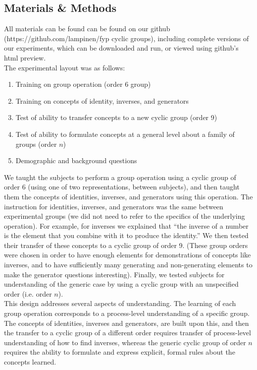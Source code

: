 \documentclass[11pt]{article}
\begin{document}
\subsection{Materials \& Methods} 
All materials can be found can be found on our github (https://github.com/lampinen/fyp cyclic groups), including complete versions of our experiments, which can be downloaded and run, or viewed using github's html preview. \\[11pt]
The experimental layout was as follows:
\begin{enumerate}
\item Training on group operation (order 6 group)
\item Training on concepts of identity, inverses, and generators
\item Test of ability to transfer concepts to a new cyclic group (order 9)
\item Test of ability to formulate concepts at a general level about a family of groups (order $n$)
\item Demographic and background questions
\end{enumerate}
We taught the subjects to perform a group operation using a cyclic group of order 6 (using one of two representations, between subjects), and then taught them the concepts of identities, inverses, and generators using this operation. The instruction for identities, inverses, and generators was the same between experimental groups (we did not need to refer to the specifics of the underlying operation). For example, for inverses we explained that ``the inverse of a number is the element that you combine with it to produce the identity.'' We then tested their transfer of these concepts to a cyclic group of order 9. (These group orders were chosen in order to have enough elements for demonstrations of concepts like inverses, and to have sufficiently many generating and non-generating elements to make the generator questions interesting). Finally, we tested subjects for understanding of the generic case by using a cyclic group with an unspecified order (i.e. order $n$). \\[11pt]
This design addresses several aspects of understanding. The learning of each group operation corresponds to a process-level understanding of a specific group. The concepts of identities, inverses and generators, are built upon this, and then the transfer to a cyclic group of a different order requires transfer of process-level understanding of how to find inverses, whereas the generic cyclic group of order $n$ requires the ability to formulate and express explicit, formal rules about the concepts learned. 
\end{document}
